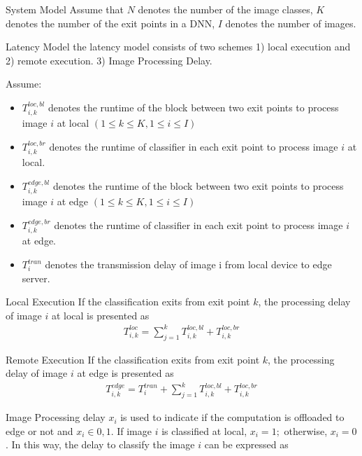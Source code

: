 \begin{enumdescript}
	\item[System Model]
	Assume that $ N $ denotes the number of the image classes, $ K $ denotes the number of the exit points in a DNN, $ I $ denotes the number of images.
	\begin{enumdescript}
		\item[Latency Model] the latency model consists of two schemes 1) local execution and 2) remote execution. 3) Image Processing Delay.
		
		Assume:
		\begin{itemize}
			\item $T_{i,k}^{loc,bl}$ denotes the runtime of the block between two exit points to process image $ i $ at local $(1 \leq k \leq K, 1 \leq i \leq I)$
			\item $T_{i,k}^{loc,br}$ denotes the runtime of classifier in each exit point to process image $i$ at local.
			\item $T_{i,k}^{edge,bl}$ denotes the runtime of the block between two exit points to process image $ i $ at edge $(1 \leq k \leq K, 1 \leq i \leq I)$
			\item $T_{i,k}^{edge,br}$ denotes the runtime of classifier in each exit point to process image $i$ at edge.
			\item $ T_{i}^{tran} $ denotes the transmission delay of image i from local device to edge server.
		\end{itemize}
		\begin{enumdescript}
			\item[Local Execution] If the classification exits from exit point $ k $, the processing delay of image $ i $ at local is presented as
			\begin{align}
			T_{i,k}^{loc}=\sum_{j=1}^{k} T_{i,k}^{loc,bl} + T_{i,k}^{loc,br} 
			\end{align}
			\item[Remote Execution] If the classification exits from exit point $ k $, the processing delay of image $ i $ at edge is presented as
			\begin{align}
			T_{i,k}^{edge}=T_{i}^{tran}+\sum_{j=1}^{k} T_{i,k}^{loc,bl} + T_{i,k}^{loc,br}
			\end{align}
			\item[Image Processing delay] $ x_i $ is used to indicate if the computation is offloaded to edge or not and $ x_i \in 0,1$. If image $ i $ is classified at local, $ x_i = 1; $ otherwise, $ x_i = 0 $. In this way, the delay to classify the image $ i $ can be expressed as

\end{enumdescript}
\end{enumdescript}
\end{enumdescript}
